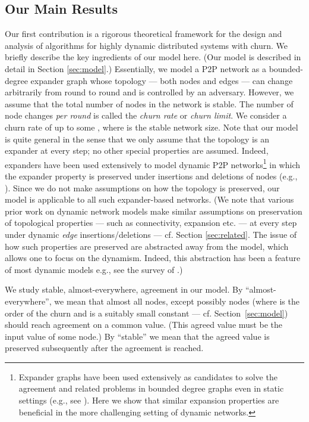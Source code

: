 \documentclass[leqno,11pt]{article}
\begin{document}
\subsection{Our Main Results}
 Our first contribution is a
rigorous theoretical framework for the design and analysis of algorithms for
highly dynamic distributed systems with churn. We briefly describe the key ingredients of our model here. (Our model is described in detail in  Section
\ref{sec:model}.) Essentially, we model a P2P network as a bounded-degree expander graph   whose topology --- both nodes and edges ---  can change arbitrarily from round to round and is controlled by an adversary. However, we assume
that the total number of nodes in the network is stable.  The number of node
changes {\em per round} is called the {\em churn rate} or {\em churn limit}. We
consider a churn rate of up to some ,
where  is the stable network size. Note that our model is quite general in the
sense that we only assume that the topology is an expander at every step; no other special
properties are assumed. Indeed,  expanders have been used extensively to
model dynamic P2P networks\footnote{Expander graphs
have been used extensively as candidates to solve the agreement and related problems
in bounded degree graphs even in static settings (e.g., see \cite{DPPU88,KKKSS10, KS10,KSS06, Upfal94}).  Here we show that similar expansion properties are beneficial in the more challenging setting of dynamic networks.}   in which the expander property is preserved under insertions and
deletions of nodes (e.g., \cite{LS03,PRU01}). 
 Since we do not make assumptions on how the topology is preserved,
 our model is applicable to all such expander-based networks.  (We note that  various prior work on  dynamic network models make similar assumptions on preservation of  topological  properties  --- such as connectivity, expansion etc. ---
 at every step  under dynamic {\em edge} insertions/deletions --- cf. Section \ref{sec:related}.  The issue
 of how such properties are preserved are abstracted away from the model, which allows one to focus on
 the dynamism. Indeed, this abstraction has been a feature of most dynamic
 models e.g., see the survey  of \cite{santoro}.) 
 
We study stable, almost-everywhere,  agreement in our model. By ``almost-everywhere'',
we mean that almost all nodes, except possibly  nodes (where  is the order of the churn and  is a suitably small constant --- cf. Section~\ref{sec:model}) should reach agreement on a common value.
(This agreed value must be the input value of some node.) By ``stable'' we mean that the agreed value is preserved subsequently after the agreement is reached.
 
\end{document}
